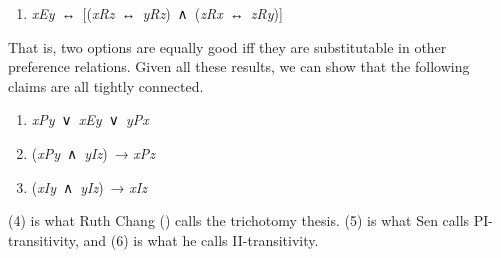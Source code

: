 \documentclass[
  11pt,
  letterpaper,
  DIV=11,
  numbers=noendperiod,
  twoside]{scrartcl}
\providecommand{\tightlist}{%
  \setlength{\itemsep}{0pt}\setlength{\parskip}{0pt}}
\begin{document}
\begin{enumerate}
\def\labelenumi{(\arabic{enumi})}
\setcounter{enumi}{2}
\tightlist
\item
  \emph{xEy}~↔︎~{[}(\emph{xRz}~↔︎~\emph{yRz})~∧~(\emph{zRx}~↔︎~\emph{zRy}){]}
\end{enumerate}

That is, two options are equally good iff they are substitutable in
other preference relations. Given all these results, we can show that
the following claims are all tightly connected.

\begin{enumerate}
\def\labelenumi{(\arabic{enumi})}
\setcounter{enumi}{3}
\tightlist
\item
  \emph{xPy}~∨~\emph{xEy}~∨~\emph{yPx}
\item
  (\emph{xPy}~∧~\emph{yIz})~→ \emph{xPz}
\item
  (\emph{xIy}~∧~\emph{yIz})~→ \emph{xIz}
\end{enumerate}

(4) is what Ruth Chang () calls the
trichotomy thesis. (5) is what Sen calls PI-transitivity, and (6) is
what he calls II-transitivity.
\end{document}
